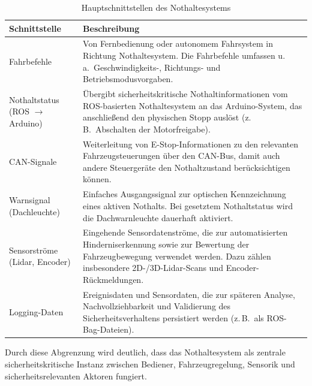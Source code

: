 \begin{table}[h]
  \centering
  \caption{Hauptschnittstellen des Nothaltesystems}
  \label{tab:schnittstellen_nothalt}
  \begin{tabular}{p{}p{}}
    \hline
    \textbf{Schnittstelle} & \textbf{Beschreibung} \\
    \hline
    Fahrbefehle &
    Von Fernbedienung oder autonomem Fahrsystem in Richtung
    Nothaltesystem. Die Fahrbefehle umfassen u.\,a.\ Geschwindigkeits-,
    Richtungs- und Betriebsmodusvorgaben. \\

    Nothaltstatus (ROS $\rightarrow$ Arduino) &
    Übergibt sicherheitskritische Nothaltinformationen vom ROS-basierten
    Nothaltesystem an das Arduino-System, das anschließend den
    physischen Stopp auslöst (z.\,B.\ Abschalten der Motorfreigabe). \\

    CAN-Signale &
    Weiterleitung von E-Stop-Informationen zu den relevanten
    Fahrzeugsteuerungen über den CAN-Bus, damit auch andere
    Steuergeräte den Nothaltzustand berücksichtigen können. \\

    Warnsignal (Dachleuchte) &
    Einfaches Ausgangssignal zur optischen Kennzeichnung eines aktiven
    Nothalts. Bei gesetztem Nothaltstatus wird die Dachwarnleuchte
    dauerhaft aktiviert. \\

    Sensorströme (Lidar, Encoder) &
    Eingehende Sensordatenströme, die zur automatisierten
    Hinderniserkennung sowie zur Bewertung der Fahrzeugbewegung
    verwendet werden. Dazu zählen insbesondere 2D-/3D-Lidar-Scans
    und Encoder-Rückmeldungen. \\

    Logging-Daten &
    Ereignisdaten und Sensordaten, die zur späteren Analyse,
    Nachvollziehbarkeit und Validierung des Sicherheitsverhaltens
    persistiert werden (z.\,B.\ als ROS-Bag-Dateien). \\
    \hline
  \end{tabular}
\end{table}

Durch diese Abgrenzung wird deutlich, dass das Nothaltesystem als
zentrale sicherheitskritische Instanz zwischen Bediener, Fahrzeugregelung,
Sensorik und sicherheitsrelevanten Aktoren fungiert.


